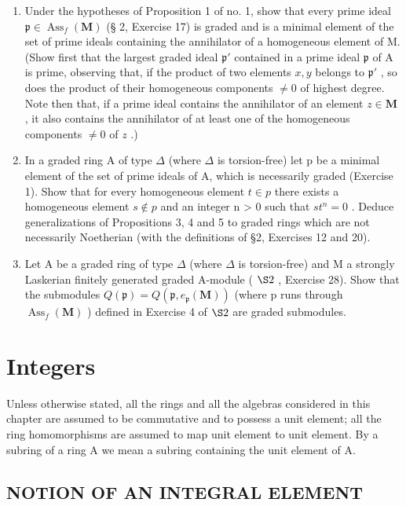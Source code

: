 \begin{enumerate}
\def\labelenumi{\arabic{enumi}.}
\item
  Under the hypotheses of Proposition 1 of no. 1, show that every prime ideal \(\mathfrak{p} \in \operatorname{Ass}_f(\mathbf{M})\) (§ 2, Exercise 17) is graded and is a minimal element of the set of prime ideals containing the annihilator of a homogeneous element of M. (Show first that the largest graded ideal \(\mathfrak{p}'\) contained in a prime ideal \(\mathfrak{p}\) of A is prime, observing that, if the product of two elements \(x, y\) belongs to \(\mathfrak{p}'\) , so does the product of their homogeneous components \(\neq 0\) of highest degree. Note then that, if a prime ideal contains the annihilator of an element \(z \in \mathbf{M}\) , it also contains the annihilator of at least one of the homogeneous components \(\neq 0\) of \(z\) .)
\item
  In a graded ring A of type \(\Delta\) (where \(\Delta\) is torsion-free) let p be a minimal element of the set of prime ideals of A, which is necessarily graded (Exercise 1). Show that for every homogeneous element \(t \in p\) there exists a homogeneous element \(s \notin p\) and an integer n \textgreater{} 0 such that \(st^{n} = 0\) . Deduce generalizations of Propositions 3, 4 and 5 to graded rings which are not necessarily Noetherian (with the definitions of §2, Exercises 12 and 20).
\item
  Let A be a graded ring of type \(\Delta\) (where \(\Delta\) is torsion-free) and M a strongly Laskerian finitely generated graded A-module ( \(\S 2\) , Exercise 28). Show that the submodules \(Q(\mathfrak{p}) = Q(\mathfrak{p}, e_{\mathfrak{p}}(\mathbf{M}))\) (where p runs through \(\operatorname{Ass}_{f}(\mathbf{M})\) ) defined in Exercise 4 of \(\S 2\) are graded submodules.
\end{enumerate}

\chapter{Integers}

Unless otherwise stated, all the rings and all the algebras considered in this chapter are assumed to be commutative and to possess a unit element; all the ring homomorphisms are assumed to map unit element to unit element. By a subring of a ring A we mean a subring containing the unit element of A.

\section{NOTION OF AN INTEGRAL ELEMENT}

